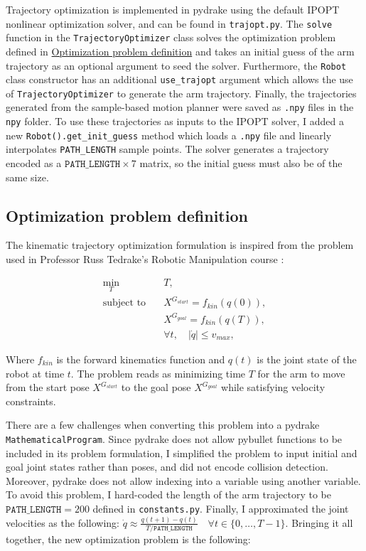 \documentclass{article}
\begin{document}
Trajectory optimization is implemented in pydrake using the default IPOPT nonlinear optimization solver, and can be found in \texttt{trajopt.py}. The \texttt{solve} function in the \texttt{TrajectoryOptimizer} class solves the optimization problem defined in \href{sec:opt}{Optimization problem definition} and takes an initial guess of the arm trajectory as an optional argument to seed the solver. Furthermore, the \texttt{Robot} class constructor has an additional \texttt{use\_trajopt} argument which allows the use of \texttt{TrajectoryOptimizer} to generate the arm trajectory. Finally, the trajectories generated from the sample-based motion planner were saved as \texttt{.npy} files in the \texttt{npy} folder. To use these trajectories as inputs to the IPOPT solver, I added a new \texttt{Robot().get\_init\_guess} method which loads a \texttt{.npy} file and linearly interpolates \texttt{PATH\_LENGTH} sample points. The solver generates a trajectory encoded as a $\mathtt{PATH\_LENGTH}\times7$ matrix, so the initial guess must also be of the same size.

\subsection{Optimization problem definition}
\label{sec:opt}

The kinematic trajectory optimization formulation is inspired from the problem used in Professor Russ Tedrake's Robotic Manipulation course \cite{Tedrake}:

\begin{equation*}
\begin{aligned}
    \min_T\quad & T,\\
    \textrm{subject to}\quad & X^{G_{start}}=f_{kin}(q(0)),\\
                             & X^{G_{goal}}=f_{kin}(q(T)),\\
                             & \forall t,\quad |\dot q|\le v_{max},
\end{aligned}
\end{equation*}

Where $f_{kin}$ is the forward kinematics function and $q(t)$ is the joint state of the robot at time $t$. The problem reads as minimizing time $T$ for the arm to move from the start pose $X^{G_{start}}$ to the goal pose $X^{G_{goal}}$ while satisfying velocity constraints. 

There are a few challenges when converting this problem into a pydrake \texttt{MathematicalProgram}. Since pydrake does not allow pybullet functions to be included in its problem formulation, I simplified the problem to input initial and goal joint states rather than poses, and did not encode collision detection. Moreover, pydrake does not allow indexing into a variable using another variable. To avoid this problem, I hard-coded the length of the arm trajectory to be $\mathtt{PATH\_LENGTH}=200$ defined in \texttt{constants.py}. Finally, I approximated the joint velocities as the following: $\dot q\approx \frac{q(t+1)-q(t)}{T/\texttt{PATH\_LENGTH}}\quad\forall t\in\{0,\dots,T-1\}$. Bringing it all together, the new optimization problem is the following:
\end{document}

